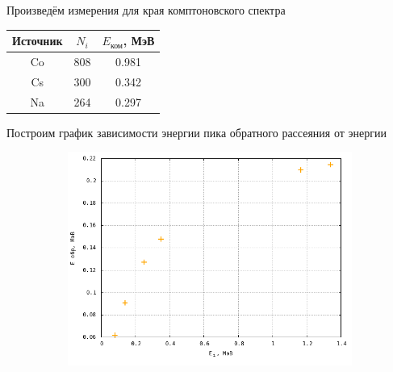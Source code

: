 \documentclass[12pt]{article}
\begin{document}
\par
	Произведём измерения для края комптоновского спектра
\begin{table}[h!]
	\centering
	\begin{tabular}{|c|c|c|}
	\hline
		Источник & $N_i$ & $E_\text{ком}$, МэВ\\
	\hline
		Co&	808&	0.981 \\
	\hline
		Cs&	300&	0.342 \\
	\hline
		Na&	264&	0.297 \\
	\hline
	\end{tabular}
\end{table}
\newpage
\par
	Построим график зависимости энергии пика обратного рассеяния от энергии
\begin{figure}[h!]	
	\centering
	\includegraphics[width = 13cm, height=7cm]{plot3.png}
\end{figure}
\end{document}
